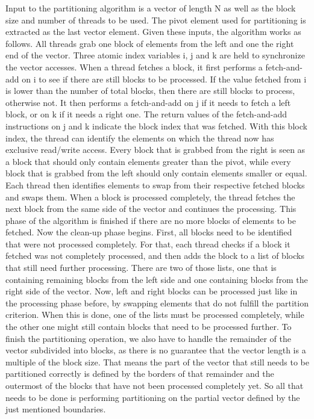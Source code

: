 \documentclass[sigconf]{acmart}
\begin{document}
Input to the partitioning algorithm is a vector of length N as well as the block size and number of threads to be used. The pivot element used for partitioning is extracted as the last vector element. Given these inputs, the algorithm works as follows. All threads grab one block of elements from the left and one the right end of the vector. Three atomic index variables i, j and k are held to synchronize the vector accesses. When a thread fetches a block, it first performs a fetch-and-add on i to see if there are still blocks to be processed. If the value fetched from i is lower than the number of total blocks, then there are still blocks to process, otherwise not. It then performs a fetch-and-add on j if it needs to fetch a left block, or on k if it needs a right one. The return values of the fetch-and-add instructions on j and k indicate the block index that was fetched. With this block index, the thread can identify the elements on which the thread now has exclusive read/write access. Every block that is grabbed from the right is seen as a block that should only contain elements greater than the pivot, while every block that is grabbed from the left should only contain elements smaller or equal. Each thread then identifies elements to swap from their respective fetched blocks and swaps them. When a block is processed completely, the thread fetches the next block from the same side of the vector and continues the processing. This phase of the algorithm is finished if there are no more blocks of elements to be fetched.
Now the clean-up phase begins. First, all blocks need to be identified that were not processed completely. For that, each thread checks if a block it fetched was not completely processed, and then adds the block to a list of blocks that still need further processing. There are two of those lists, one that is containing remaining blocks from the left side and one containing blocks from the right side of the vector. Now, left and right blocks can be processed just like in the processing phase before, by swapping elements that do not fulfill the partition criterion. When this is done, one of the lists must be processed completely, while the other one might still contain blocks that need to be processed further. To finish the partitioning operation, we also have to handle the remainder of the vector subdivided into blocks, as there is no guarantee that the vector length is a multiple of the block size. That means the part of the vector that still needs to be partitioned correctly is defined by the borders of that remainder and the outermost of the blocks that have not been processed completely yet. So all that needs to be done is performing partitioning on the partial vector defined by the just mentioned boundaries.
\end{document}
